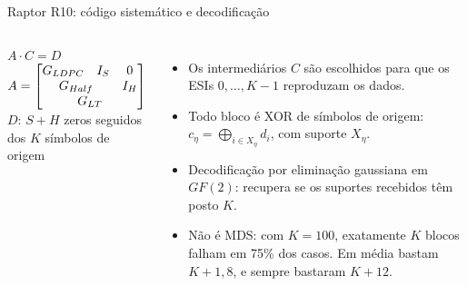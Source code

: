 \documentclass[aspectratio=169,10pt]{beamer}
\newenvironment{topicos}{\begin{itemize}\setlength{\itemsep}{0.7em}}{\end{itemize}}
\begin{document}
\begin{frame}{Raptor R10: código sistemático e decodificação}
	\begin{columns}[c, onlytextwidth]
		\centering
		$A \cdot C = D$\\[0.6em]
		$A = \begin{bmatrix}
			G_{LDPC} & I_S & 0 \\
			\multicolumn{2}{c}{G_{Half}} & I_H \\
			\multicolumn{3}{c}{G_{LT}}
		\end{bmatrix}$\\[0.6em]
		{\small $D$: $S + H$ zeros seguidos dos $K$ símbolos de origem}
		\begin{topicos}
			\item Os intermediários $C$ são escolhidos para que os ESIs $0, \ldots, K-1$ \alert{reproduzam os dados}.
			\item Todo bloco é XOR de símbolos de origem: $c_\eta = \bigoplus_{i \in X_\eta} d_i$, com suporte $X_\eta$.
			\item Decodificação por eliminação gaussiana em $GF(2)$: recupera se os suportes recebidos têm \alert{posto $K$}.
			\item Não é MDS: com $K = 100$, exatamente $K$ blocos falham em 75\% dos casos. Em média bastam \alert{$K + 1{,}8$}, e sempre bastaram $K + 12$.
		\end{topicos}
	\end{columns}
\end{frame}
\end{document}
